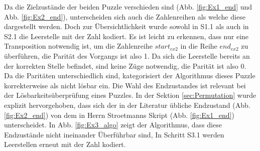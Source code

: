 Da die Zielzustände der beiden Puzzle verschieden sind (Abb. \ref{fig:Ex1_end} und Abb. \ref{fig:Ex2_end}), unterscheiden sich auch die Zahlenreihen als welche diese dargestellt werden. Doch zur Übersichtlichkeit wurde sowohl in S1.1 als auch in S2.1 die Leerstelle mit der Zahl  kodiert. Es ist leicht zu erkennen, dass nur eine Transposition notwendig ist, um die Zahlenreihe $start_{ex2}$ in die Reihe $end_{ex2}$ zu überführen, die Parität des Vorgangs ist also 1. Da sich die Leerstelle bereits an der korrekten Stelle befindet, sind keine Züge notwendig, die Parität ist also 0. Da die Paritäten unterschiedlich sind, kategorisiert der Algorithmus dieses Puzzle korrekterweise als  nicht lösbar ein.\WNL
%
%
Die Wahl des Endzustandes ist relevant bei der Lösbarkeitsüberprüfung eines Puzzles. In der Sektion \ref{sec:Permutation} wurde explizit hervorgehoben, dass sich der in der Literatur übliche Endzustand (Abb. \ref{fig:Ex2_end}) von dem in Herrn Stroetmanns Skript \autocite{github-stroetmann:online} (Abb. \ref{fig:Ex1_end}) unterscheidet. In Abb. \ref{fig:Ex3_algo} zeigt der Algorithmus, dass diese Endzustände nicht ineinander Überführbar sind, In Schritt S3.1 werden Leerstellen erneut mit der Zahl  kodiert.
